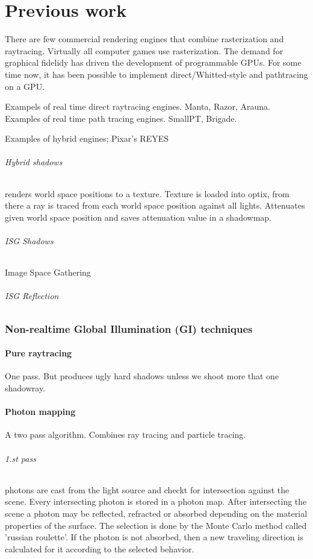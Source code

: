 \part{Previous work}

There are few commercial rendering engines that combine rasterization and raytracing. Virtually all computer games use rasterization. The demand for graphical fidelidy has driven the development of programmable GPUs. For some time now, it has been possible to implement direct/Whitted-style and pathtracing on a GPU.

Exampels of real time direct raytracing engines. Manta, Razor, Arauna.
Examples of real time path tracing engines. SmallPT, Brigade.

Examples of hybrid engines; Pixar's REYES

\paragraph{Hybrid shadows} renders world space positions to a texture. Texture is loaded into optix, from there a ray is traced from each world space position against all lights. Attenuates given world space position and saves attenuation value in a shadowmap.

\paragraph{ISG Shadows} Image Space Gathering \cite{nvidiarobison09}
\paragraph{ISG Reflection}


\section {Non-realtime Global Illumination (GI) techniques}
		\subsection{Pure raytracing} 
		One pass. But produces ugly hard shadows unless we shoot more that one shadowray.
	\subsection{Photon mapping} A two pass algorithm. Combines ray tracing and particle tracing.
		\paragraph{1.st pass} photons are cast from the light source and checkt for intersection against the scene.    Every intersecting photon is stored in a photon map. After intersecting the scene a photon may be reflected, refracted or absorbed depending on the material properties of the surface. The selection is done by the Monte Carlo method called 'russian roulette'. If the photon is not absorbed, then a new traveling direction is calculated for it according to the selected behavior.
			
